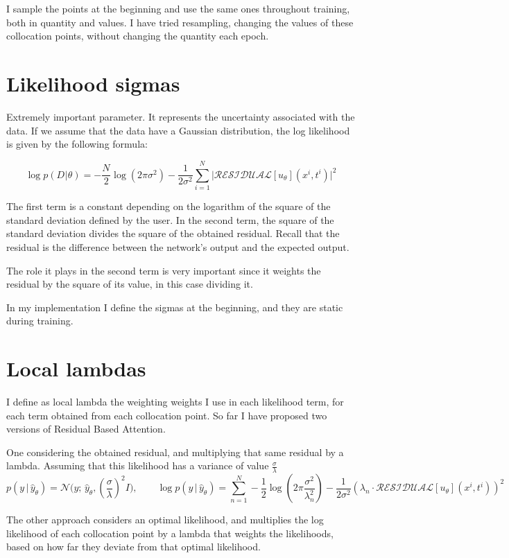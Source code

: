 \documentclass{article}
\begin{document}
I sample the points at the beginning and use the same ones throughout training, both in quantity and values. I have tried resampling, changing the values of these collocation points, without changing the quantity each epoch.

\section{Likelihood sigmas}

Extremely important parameter. It represents the uncertainty associated with the data.
If we assume that the data have a Gaussian distribution, the log likelihood is given by the following formula:

$$
\log p(D_{}| \theta)=
-\frac{N_{}}{2}\log (2\pi\sigma^2_{})-\frac{1}{2\sigma^2_{}}\sum_{i=1}^{N_{}}\bigl|\mathcal{RESIDUAL}[u_\theta](x_{}^{i},t^i)\bigr|^2
$$

The first term is a constant depending on the logarithm of the square of the standard deviation defined by the user. In the second term, the square of the standard deviation divides the square of the obtained residual. Recall that the residual is the difference between the network's output and the expected output.

The role it plays in the second term is very important since it weights the residual by the square of its value, in this case dividing it.

In my implementation I define the sigmas at the beginning, and they are static during training.

\section{Local lambdas}

I define as local lambda the weighting weights I use in each likelihood term, for each term obtained from each collocation point.
So far I have proposed two versions of Residual Based Attention.

One considering the obtained residual, and multiplying that same residual by a lambda. Assuming that this likelihood has a variance of value $\frac{\sigma}{\lambda}$
$$
p(y\,|\,\hat{y}_\theta) =
\mathcal{N}\bigl(y;\,\hat{y}_\theta,(\frac{\sigma}{\lambda})^2 I\bigr),
\qquad
\log p(y\,|\,\hat{y}_\theta)
= \sum_{n=1}^N -\frac{1}{2} \log (2\pi\frac{\sigma^2}{\lambda_n^2}) - \frac{1}{2\sigma^2}(\lambda_n \cdot \mathcal{RESIDUAL}[u_\theta](x_{}^{i},t^i))^2
$$

The other approach considers an optimal likelihood, and multiplies the log likelihood of each collocation point by a lambda that weights the likelihoods, based on how far they deviate from that optimal likelihood.
\end{document}
